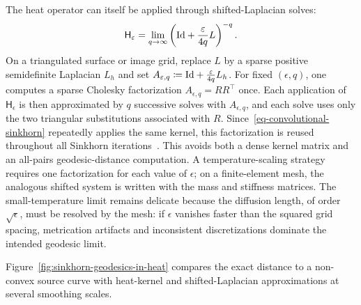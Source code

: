 The heat operator can itself be applied through shifted-Laplacian solves:
\[
	\mathsf H_\varepsilon
	=
	\lim_{q\to\infty}
	\left(\mathrm{Id}+\frac{\varepsilon}{4q}L\right)^{-q}.
\]
On a triangulated surface or image grid, replace $L$ by a sparse positive semidefinite Laplacian $L_h$ and set $A_{\varepsilon,q}\coloneqq \mathrm{Id}+\frac{\varepsilon}{4q}L_h$.
For fixed $(\epsilon,q)$, one computes a sparse Cholesky factorization $A_{\epsilon,q}=RR^\top$ once. Each application of $\mathsf H_\epsilon$ is then approximated by $q$ successive solves with $A_{\epsilon,q}$, and each solve uses only the two triangular substitutions associated with $R$. Since~\eqref{eq-convolutional-sinkhorn} repeatedly applies the same kernel, this factorization is reused throughout all Sinkhorn iterations~\cite{2015-solomon-siggraph}. This avoids both a dense kernel matrix and an all-pairs geodesic-distance computation. A temperature-scaling strategy requires one factorization for each value of $\epsilon$; on a finite-element mesh, the analogous shifted system is written with the mass and stiffness matrices. The small-temperature limit remains delicate because the diffusion length, of order $\sqrt\epsilon$, must be resolved by the mesh: if $\epsilon$ vanishes faster than the squared grid spacing, metrication artifacts and inconsistent discretizations dominate the intended geodesic limit.

Figure~\ref{fig:sinkhorn-geodesics-in-heat} compares the exact distance to a non-convex source curve with heat-kernel and shifted-Laplacian approximations at several smoothing scales.

